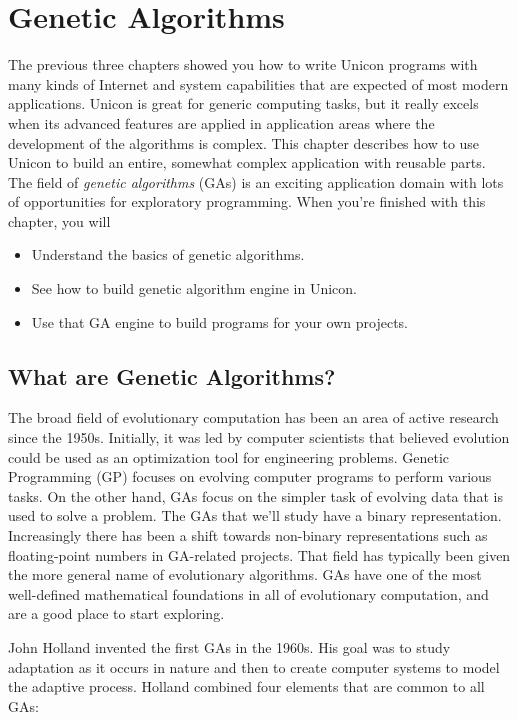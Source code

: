 \chapter{Genetic Algorithms}

The previous three chapters showed you how to write Unicon programs with
many kinds of Internet and system capabilities that are expected of
most modern applications. Unicon is great for generic computing tasks,
but it really excels when its advanced features are applied in
application areas where the development of the algorithms is complex.
This chapter describes how to use Unicon to build an entire, somewhat
complex application with reusable parts. The field of \textit{genetic algorithms} (GAs) is an exciting application
domain with lots of opportunities for exploratory programming. When
you're finished with this chapter, you will 
\begin{itemize}
\item Understand the basics of genetic algorithms.
\item See how to build genetic algorithm engine in Unicon.
\item Use that GA engine to build programs for your own projects.
\end{itemize}

\section{What are Genetic Algorithms?}

The broad field of evolutionary computation has been an area of active
research since the 1950s. Initially, it was led by computer scientists
that believed evolution could be used as an optimization tool for
engineering problems. Genetic Programming (GP) focuses on evolving
computer programs to perform various tasks. On the other hand, GAs
focus on the simpler task of evolving data that is used to solve a
problem. The GAs that we'll study have a binary
representation. Increasingly there has been a shift towards non-binary
representations such as floating-point numbers in GA-related projects.
That field has typically been given the more general name of
evolutionary algorithms. GAs have one of the most well-defined
mathematical foundations in all of evolutionary computation, and are a
good place to start exploring. 

John Holland invented the first GAs in the 1960s. His goal was to study
adaptation as it occurs in nature and then to create computer systems
to model the adaptive process. Holland combined four elements that are
common to all GAs:

